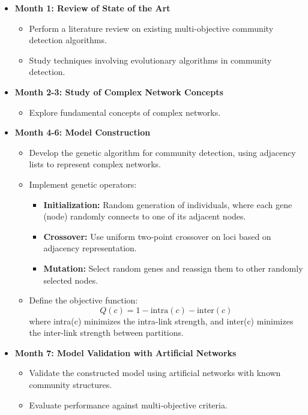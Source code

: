 \documentclass{article}
\begin{document}
\begin{itemize}
    \item \textbf{Month 1: Review of State of the Art}
    \begin{itemize}
        \item Perform a literature review on existing multi-objective community detection algorithms.
        \item Study techniques involving evolutionary algorithms in community detection.
    \end{itemize}

    \item \textbf{Month 2-3: Study of Complex Network Concepts}
    \begin{itemize}
        \item Explore fundamental concepts of complex networks.
    \end{itemize}

    \item \textbf{Month 4-6: Model Construction}
    \begin{itemize}
        \item Develop the genetic algorithm for community detection, using adjacency lists to represent complex networks.
        \item Implement genetic operators:
        \begin{itemize}
            \item \textbf{Initialization:} Random generation of individuals, where each gene (node) randomly connects to one of its adjacent nodes.
            \item \textbf{Crossover:} Use uniform two-point crossover on loci based on adjacency representation.
            \item \textbf{Mutation:} Select random genes and reassign them to other randomly selected nodes.
        \end{itemize}
        \item Define the objective function:
        \[
        Q(c) = 1 - \text{intra}(c) - \text{inter}(c)
        \]
        where intra(c) minimizes the intra-link strength, and inter(c) minimizes the inter-link strength between partitions.
    \end{itemize}

    \item \textbf{Month 7: Model Validation with Artificial Networks}
    \begin{itemize}
        \item Validate the constructed model using artificial networks with known community structures.
        \item Evaluate performance against multi-objective criteria.
    \end{itemize}


\end{itemize}
\end{document}
